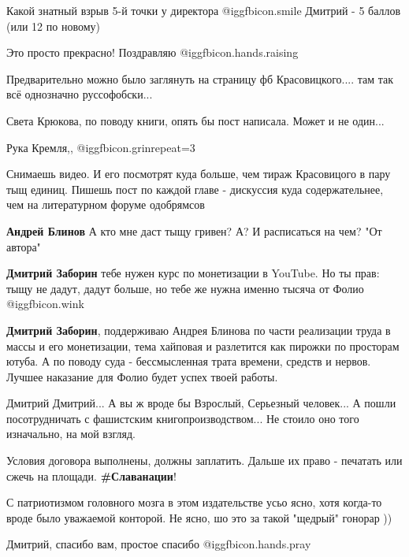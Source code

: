 \begin{itemize}
Какой знатный взрыв 5-й точки у директора  @igg{fbicon.smile} 
Дмитрий - 5 баллов (или 12 по новому)

Это просто прекрасно! Поздравляю  @igg{fbicon.hands.raising} 

Предварительно можно было заглянуть на страницу фб Красовицкого.... там так всё однозначно руссофобски...

Света Крюкова, по поводу книги, опять бы пост написала. Может и не один...

Рука Кремля,, @igg{fbicon.grin}{repeat=3} 


Снимаешь видео. И его посмотрят куда больше, чем тираж Красовицого в пару тыщ
единиц. Пишешь пост по каждой главе - дискуссия куда содержательнее, чем на
литературном форуме одобрямсов

\begin{itemize} %
\textbf{Андрей Блинов} А кто мне даст тыщу гривен? А? И расписаться на чем? "От автора"

\textbf{Дмитрий Заборин} тебе нужен курс по монетизации в YouTube. Но ты прав: тыщу не дадут, дадут больше, но тебе же нужна именно тысяча от Фолио  @igg{fbicon.wink} 

\textbf{Дмитрий Заборин}, поддерживаю Андрея Блинова по части реализации труда в массы и его монетизации, тема хайповая и разлетится как пирожки по просторам ютуба. А по поводу суда - бессмысленная трата времени, средств и нервов. Лучшее наказание для Фолио будет успех твоей работы.
\end{itemize} %

Дмитрий Дмитрий... А вы ж вроде бы Взрослый, Серьезный человек... А пошли посотрудничать с фашистским книгопроизводством... Не стоило оно того изначально, на мой взгляд.

Условия договора выполнены, должны заплатить.
Дальше их право - печатать или сжечь на площади.
\textbf{\#Славанации}!

С патриотизмом головного мозга в этом издательстве усьо ясно, хотя когда-то вроде было уважаемой конторой.
Не ясно, шо это за такой "щедрый" гонорар ))

Дмитрий, спасибо вам, простое спасибо  @igg{fbicon.hands.pray} 


\end{itemize}

